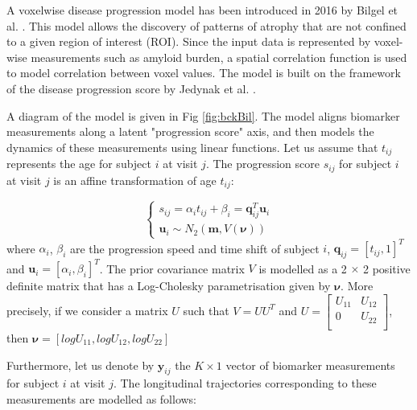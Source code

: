 A voxelwise disease progression model has been introduced in 2016 by Bilgel et al. \cite{bilgel2016multivariate}. This model allows the discovery of patterns of atrophy that are not confined to a given region of interest (ROI). Since the input data is represented by voxel-wise measurements such as amyloid burden, a spatial correlation function is used to model correlation between voxel values. The model is built on the framework of the disease progression score by Jedynak et al. \cite{jedynak2012computational}. 

A diagram of the model is given in Fig \ref{fig:bckBil}. The model aligns biomarker measurements along a latent "progression score" axis, and then models the dynamics of these measurements using linear functions. Let us assume that $t_{ij}$ represents the age for subject $i$ at visit $j$. The progression score $s_{ij}$ for subject $i$ at visit $j$ is an affine transformation of age $t_{ij}$:

\begin{equation}
 \begin{cases}
 s_{ij} = \alpha_i t_{ij} + \beta_i = \textbf{q}_{ij}^T\textbf{u}_i\\
 \textbf{u}_i \sim N_2(\textbf{m}, V(\boldsymbol{\nu}))
\end{cases}
\end{equation}
where $\alpha_i$, $\beta_i$ are the progression speed and time shift of subject $i$, $\textbf{q}_{ij} = [t_{ij}, 1]^T$ and $\textbf{u}_{i} = [\alpha_i, \beta_i]^T$. The prior covariance matrix $V$ is modelled as a 2 $\times$ 2 positive definite matrix that has a Log-Cholesky parametrisation given by $\boldsymbol{\nu}$. More precisely, if we consider a matrix $U$ such that $V = UU^T$ and $U = \begin{bmatrix}
    U_{11} & U_{12} \\
    0 & U_{22}\\
\end{bmatrix}$, then $\boldsymbol{\nu} = [logU_{11}, logU_{12}, logU_{22}]$

Furthermore, let us denote by $\textbf{y}_{ij}$ the $K \times 1$ vector of biomarker measurements for subject $i$ at visit $j$. The longitudinal trajectories corresponding to these measurements are modelled as follows:

